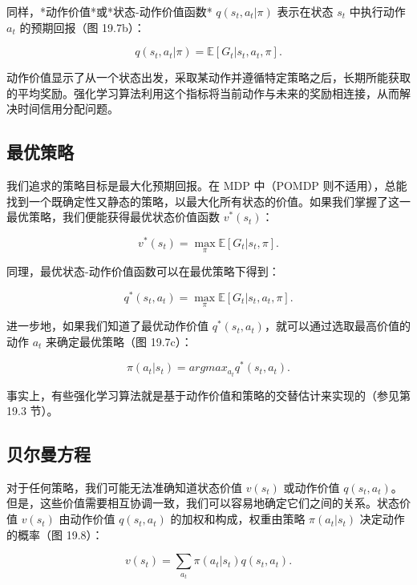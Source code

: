 \documentclass[lang=cn,newtx,10pt,scheme=chinese]{elegantbook}
\begin{document}
同样，*动作价值*或*状态-动作价值函数* \(q(s_t, a_t|\pi)\) 表示在状态 \(s_t\) 中执行动作 \(a_t\) 的预期回报（图 19.7b）：

\begin{equation}
q(s_t, a_t|\pi) = \mathbb{E} [ G_t|s_t, a_t, \pi ]. 
\end{equation}

动作价值显示了从一个状态出发，采取某动作并遵循特定策略之后，长期所能获取的平均奖励。强化学习算法利用这个指标将当前动作与未来的奖励相连接，从而解决时间信用分配问题。


\subsection{最优策略}
我们追求的策略目标是最大化预期回报。在 MDP 中（POMDP 则不适用），总能找到一个既确定性又静态的策略，以最大化所有状态的价值。如果我们掌握了这一最优策略，我们便能获得最优状态价值函数 \(v^*(s_t)\)：

\begin{equation}
v^*(s_t) = \max_{\pi} \mathbb{E} [ G_t|s_t, \pi ].  
\end{equation}

同理，最优状态-动作价值函数可以在最优策略下得到：

\begin{equation}
q^*(s_t, a_t) = \max_{\pi} \mathbb{E} [ G_t|s_t, a_t, \pi ]. 
\end{equation}

进一步地，如果我们知道了最优动作价值 \(q^*(s_t, a_t)\)，就可以通过选取最高价值的动作 \(a_t\) 来确定最优策略（图 19.7c）：

\begin{equation}
\pi(a_t|s_t) = argmax_{a_t} q^*(s_t, a_t). 
\end{equation}

事实上，有些强化学习算法就是基于动作价值和策略的交替估计来实现的（参见第 19.3 节）。

\subsection{贝尔曼方程}
对于任何策略，我们可能无法准确知道状态价值 \(v(s_t)\) 或动作价值 \(q(s_t, a_t)\)。但是，这些价值需要相互协调一致，我们可以容易地确定它们之间的关系。状态价值 \(v(s_t)\) 由动作价值 \(q(s_t, a_t)\) 的加权和构成，权重由策略 \(\pi(a_t|s_t)\) 决定动作的概率（图 19.8）：

\begin{equation}
v(s_t) = \sum_{a_t} \pi(a_t|s_t)q(s_t, a_t). 
\end{equation}
\end{document}
